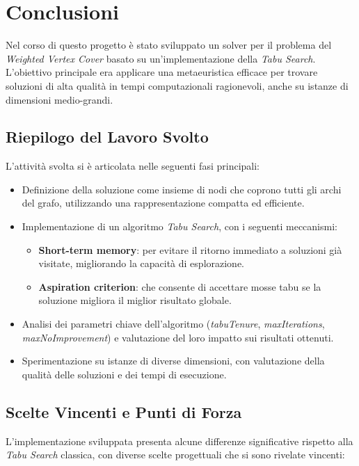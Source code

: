 \section{Conclusioni}
\label{sec:Conclusioni}


Nel corso di questo progetto è stato sviluppato un solver per il problema del \textit{Weighted Vertex Cover} basato su un’implementazione della \textit{Tabu Search}. L’obiettivo principale era applicare una metaeuristica efficace per trovare soluzioni di alta qualità in tempi computazionali ragionevoli, anche su istanze di dimensioni medio-grandi. 

\subsection{Riepilogo del Lavoro Svolto}

L'attività svolta si è articolata nelle seguenti fasi principali:

\begin{itemize}
    \item Definizione della soluzione come insieme di nodi che coprono tutti gli archi del grafo, utilizzando una rappresentazione compatta ed efficiente.
    \item Implementazione di un algoritmo \textit{Tabu Search}, con i seguenti meccanismi:
    \begin{itemize}
        \item \textbf{Short-term memory}: per evitare il ritorno immediato a soluzioni già visitate, migliorando la capacità di esplorazione.
        \item \textbf{Aspiration criterion}: che consente di accettare mosse tabu se la soluzione migliora il miglior risultato globale.
    \end{itemize}
    \item Analisi dei parametri chiave dell'algoritmo (\textit{tabuTenure}, \textit{maxIterations}, \textit{maxNoImprovement}) e valutazione del loro impatto sui risultati ottenuti.
    \item Sperimentazione su istanze di diverse dimensioni, con valutazione della qualità delle soluzioni e dei tempi di esecuzione.
\end{itemize}

\subsection{Scelte Vincenti e Punti di Forza}

L'implementazione sviluppata presenta alcune differenze significative rispetto alla \textit{Tabu Search} classica, con diverse scelte progettuali che si sono rivelate vincenti:

